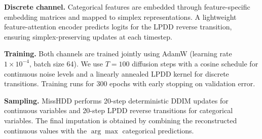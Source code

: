 \documentclass[times, review, 10pt]{elsarticle}
\begin{document}
\textbf{Discrete channel.}
Categorical features are embedded through feature-specific embedding
matrices and mapped to simplex representations. A lightweight
feature-attention encoder predicts logits for the LPDD reverse transition,
ensuring simplex-preserving updates at each timestep.

\textbf{Training.}
Both channels are trained jointly using AdamW (learning rate
$1\times10^{-4}$, batch size 64). We use $T{=}100$ diffusion steps with a
cosine schedule for continuous noise levels and a linearly annealed LPDD
kernel for discrete transitions. Training runs for 300 epochs with early
stopping on validation error.

\textbf{Sampling.}
MissHDD performs 20-step deterministic DDIM updates for continuous variables
and 20-step LPDD reverse transitions for categorical variables. The final
imputation is obtained by combining the reconstructed continuous values with
the $\arg\max$ categorical predictions.






\end{document}
